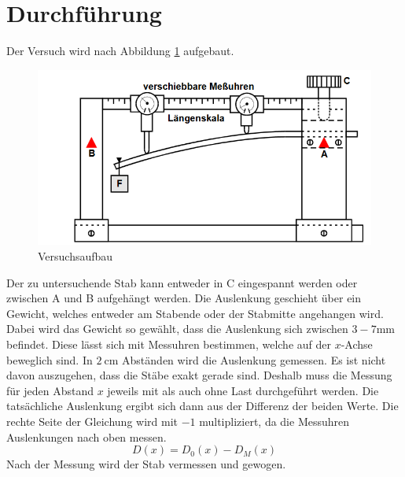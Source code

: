 \section{Durchführung}
Der Versuch wird nach Abbildung \ref{fig:aufbau} aufgebaut.
\begin{figure}
    \centering
    \includegraphics[width=\textwidth]{content/aufbau.png}
    \caption{Versuchsaufbau}
    \label{fig:aufbau}
\end{figure}
Der zu untersuchende Stab kann entweder in C eingespannt werden oder zwischen A und B aufgehängt werden.
Die Auslenkung geschieht über ein Gewicht, welches entweder am Stabende oder der Stabmitte angehangen wird.
Dabei wird das Gewicht so gewählt, dass die Auslenkung sich zwischen $3-7\si{\milli\meter}$ befindet.
Diese lässt sich mit Messuhren bestimmen, welche auf der $x$-Achse beweglich sind.
In $\SI{2}{\centi\meter}$ Abständen wird die Auslenkung gemessen.
Es ist nicht davon auszugehen, dass die Stäbe exakt gerade sind.
Deshalb muss die Messung für jeden Abstand $x$ jeweils mit als auch ohne Last durchgeführt werden.
Die tatsächliche Auslenkung ergibt sich dann aus der Differenz der beiden Werte.
Die rechte Seite der Gleichung wird mit $-1$ multipliziert, da die Messuhren Auslenkungen nach oben messen.
\begin{equation}
  D(x)=D_0(x) - D_M(x)
\end{equation}
Nach der Messung wird der Stab vermessen und gewogen.
